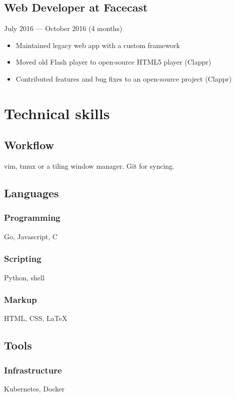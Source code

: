 \documentclass[a4paper,11pt]{article}
\begin{document}
\subsection{Web Developer at Facecast}
July 2016 --- October 2016 (4 months)
\begin{itemize}[noitemsep]
    \renewcommand{\labelitemi}{---}

    \item Maintained legacy web app with a custom framework
    \item Moved old Flash player to open-source HTML5 player (Clappr)
    \item Contributed features and bug fixes to an open-source project (Clappr)
\end{itemize}

\section{Technical skills}

\subsection{Workflow}
vim, tmux or a tiling window manager. Git for syncing.

\subsection{Languages}

\subsubsection{Programming}
Go, Javascript, C

\subsubsection{Scripting}
Python, shell

\subsubsection{Markup}
HTML, CSS, {\LaTeX}


\subsection{Tools}

\subsubsection{Infrastructure}
Kubernetes, Docker
\end{document}
